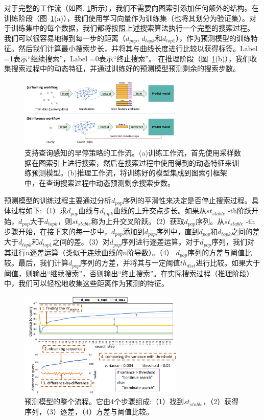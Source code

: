 对于完整的工作流（如图. \ref{fig:aware-workflow}所示），我们不需要向图索引添加任何额外的结构。在训练阶段（图~\ref{fig:aware-workflow}(a)），我们使用学习向量作为训练集（也将其划分为验证集）。对于训练集中的每个数据，我们都将按照上述搜索算法执行一个完整的搜索过程。
我们可以很容易地得到每一步的距离（$d_{pop}$, $d_{topk}$和$d_{top1}$），作为预测模型的训练特征。然后我们计算最小搜索步长，并将其与曲线长度进行比较以获得标签。Label =1表示“继续搜索”，Label =0表示“终止搜索”。
在推理阶段（图~\ref{fig:aware-workflow}(b)），我们收集搜索过程中的动态特征，并通过训练好的预测模型预测剩余的搜索步数。
\begin{figure}[tp]
  \centering
  \includegraphics[width=0.7\textwidth]{figures/context-1/aware-workflow.pdf}
  \caption{支持查询感知的早停策略的工作流。(a)训练工作流，首先使用采样数据在图索引上进行搜索，然后在搜索过程中使用得到的动态特征来训练预测模型。(b)推理工作流，将训练好的模型集成到图索引框架中，在查询搜索过程中动态预测剩余搜索步数。}
  \label{fig:aware-workflow}
\end{figure}

预测模型的训练过程主要通过分析$d_{pop}$序列的平滑性来决定是否停止搜索过程。具体过程如下:（1）求$d_{pop}$曲线与$d_{topk}$曲线的上升交点步长。如果从$st_{stable}$ -th阶跃开始，$d_{pop}$大于$d_{topk}$，则$st_{stable}$称为上升交叉阶跃。（2）获取$d_{pop}$序列。从$st_{stable}$ -th步骤开始，在接下来的每一步中，$d_{pop}$添加到$d_{pop}$序列中，直到$d_{pop}$和$d_{topk}$之间的差大于$d_{topk}$和$d_{top1}$之间的差。（3）对$d_{pop}$序列进行逐差运算。对于$d_{pop}$序列，我们对其进行$n$逐差运算（类似于连续曲线的$n$阶导数）。（4） $d_{pop}$序列的方差与阈值比较。最后，我们计算$d_{pop}$序列的方差，并将其与一定阈值$th_{dist}$进行比较。如果大于阈值，则输出“继续搜索”，否则输出“终止搜索”。在实际搜索过程（推理阶段）中，我们可以轻松地收集这些距离作为预测的特征。

\begin{figure}[tp]
  \centering
  \includegraphics[width=0.7\textwidth]{figures/context-1/prediction model.pdf}
  \caption{预测模型的整个流程。它由4个步骤组成:（1）找到$st_{stable}$，（2）获得序列，（3）逐差，（4）方差与阈值比较。}
  \label{fig:prediction-model}
\end{figure}


